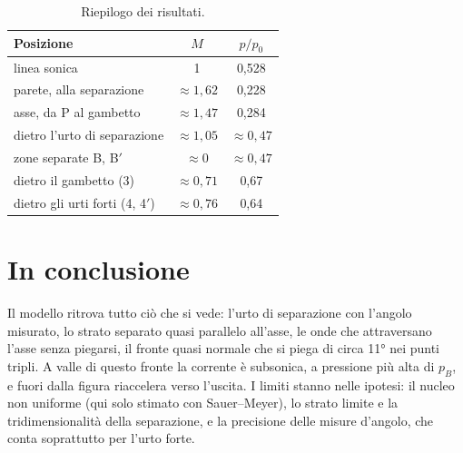 \begin{table}[H]
\centering\small
\begin{tabular}{lcc}
\toprule
Posizione & $M$ & $p/p_0$ \\
\midrule
linea sonica & 1 & 0,528 \\
parete, alla separazione & $\approx1{,}62$ & 0,228 \\
asse, da P al gambetto & $\approx1{,}47$ & 0,284 \\
dietro l'urto di separazione & $\approx1{,}05$ & $\approx0{,}47$ \\
zone separate B, B$'$ & $\approx0$ & $\approx0{,}47$ \\
dietro il gambetto (3) & $\approx0{,}71$ & 0,67 \\
dietro gli urti forti (4, 4$'$) & $\approx0{,}76$ & 0,64 \\
\bottomrule
\end{tabular}
\caption{Riepilogo dei risultati.}
\end{table}

\section*{In conclusione}
Il modello ritrova tutto ciò che si vede: l'urto di separazione con l'angolo misurato, lo strato separato quasi
parallelo all'asse, le onde che attraversano l'asse senza piegarsi, il fronte quasi normale che si piega di circa
\ang{11} nei punti tripli. A valle di questo fronte la corrente è subsonica, a pressione più alta di $p_B$, e fuori
dalla figura riaccelera verso l'uscita. I limiti stanno nelle ipotesi: il nucleo non uniforme (qui solo stimato con
Sauer--Meyer), lo strato limite e la tridimensionalità della separazione, e la precisione delle misure d'angolo,
che conta soprattutto per l'urto forte.


